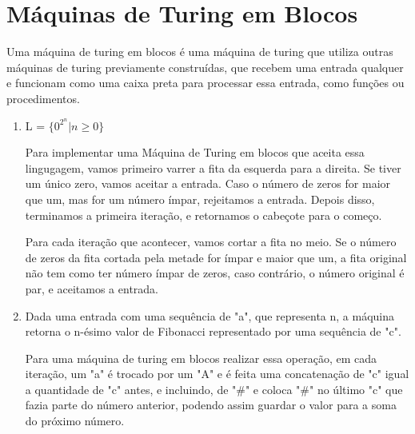 \section{Máquinas de Turing em Blocos}

Uma máquina de turing em blocos é uma máquina de turing que utiliza
outras máquinas de turing previamente construídas, que recebem uma entrada
qualquer e funcionam como uma caixa preta para processar essa entrada, como
funções ou procedimentos.

\begin{enumerate}[label=(\alph*)]

\item L = $\{0^{2^n} \vert n \geq 0\}$

Para implementar uma Máquina de Turing em blocos que aceita essa lingugagem,
vamos primeiro varrer a fita da esquerda para a direita. Se tiver um único zero,
vamos aceitar a entrada. Caso o número de zeros for maior que um, mas for um
número ímpar, rejeitamos a entrada. Depois disso, terminamos a primeira iteração,
e retornamos o cabeçote para o começo.

Para cada iteração que acontecer, vamos cortar a fita no meio. Se o número de zeros
da fita cortada pela metade for ímpar e maior que um, a fita original não tem como
ter número ímpar de zeros, caso contrário, o número original é par, e aceitamos a entrada.

\item 
Dada uma entrada com uma sequência de "a", que representa n, a máquina retorna o n-ésimo valor de Fibonacci representado por uma sequência de "c".

Para uma máquina de turing em blocos realizar essa operação, em cada iteração, um "a" é trocado por um "A" e é feita uma concatenação de "c" igual a quantidade de "c" antes, e incluindo, de "\#" e coloca "\#" no último "c" que fazia parte do número anterior, podendo assim guardar o valor para a soma do próximo número.

\end{enumerate}